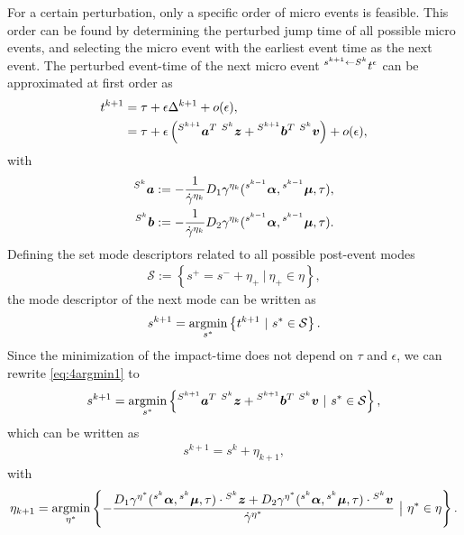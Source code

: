 \documentclass[../DC2019003Bouma.tex]{subfiles}
\begin{document}
For a certain perturbation, only a specific order of micro events is feasible. This order can be found by determining the perturbed jump time of all possible micro events, and selecting the micro event with the earliest event time as the next event. The perturbed event-time of the next micro event $\hspace{0cm}^{s^{k+1} \leftarrow S^{k}}t^\epsilon$ can be approximated at first order as
\begin{align}
t^{k+1} &= \tau + \epsilon\Delta^{k+1} + o(\epsilon),\\
&= \tau + \epsilon\left(\hspace{0cm}^{S^{k+1}}{\boldsymbol{a}}^T\ \hspace{0cm}^{S^k}{\boldsymbol{z}} +\hspace{0cm}^{S^{k+1}}{\boldsymbol{b}}^T\ \hspace{0cm}^{S^k}{\boldsymbol{v}}\right) + o(\epsilon),
\end{align}
with
\begin{align*}
\hspace{0cm}^{S^k}{\boldsymbol{a}} &:= -\frac{1}{\dot{\gamma}^{\eta_k}}D_1\gamma^{\eta_k}(\hspace{0cm}^{s^{k-1}}\boldsymbol{\alpha},\hspace{0cm}^{s^{k-1}}\boldsymbol{\mu},\tau),\\
\hspace{0cm}^{S^k}{\boldsymbol{b}} &:= -\frac{1}{\dot{\gamma}^{\eta_k}}D_2\gamma^{\eta_k}(\hspace{0cm}^{s^{k-1}}\boldsymbol{\alpha},\hspace{0cm}^{s^{k-1}}\boldsymbol{\mu},\tau).
\end{align*}
Defining the set mode descriptors related to all possible post-event modes 
\begin{align}
\mathcal{S} := \left\{ s^+ = s^- + \eta_+ \ |\ \eta_+\in \eta \right\},
\end{align}
the mode descriptor of the next mode can be written as
%
\begin{align}
s^{k+1} = \underset{s^{\ast}}{\argmin}\left\{t^{k+1}\ |\ s^{\ast}\in\mathcal{S}\right\}.\label{eq:4argmin1}
\end{align}
Since the minimization of the impact-time does not depend on $\tau$ and $\epsilon$, we can rewrite \eqref{eq:4argmin1} to
\begin{align}
s^{k+1} = \underset{s^{\ast}}{\argmin}\left\{\ls^{S^{k+1}}\ab^T\ \ls^{S^k}\zb +\ls^{S^{k+1}}\bb^T\ \ls^{S^k}\vb\ |\ s^{\ast}\in\mathcal{S}\right\},
\end{align}
which can be written as
\begin{align}
s^{k+1} = s^k + \eta_{k+1},
\end{align}
with 
\begin{align}
\eta_{k+1} = \underset{\eta^\ast}{\argmin}\left\{-\frac{D_1\gamma^{\eta^\ast}(\ls^{s^k}\alphab,\ls^{s^k}\mub,\tau)\cdot\ls^{S^k}\zb + D_2\gamma^{\eta^\ast}(\ls^{s^k}\alphab,\ls^{s^k}\mub,\tau)\cdot\ls^{S^k}\vb}{\dot{\gamma}^{\eta^\ast}}\ \big|\ \eta^{\ast}\in\eta\right\}.\label{eq:4argmin2}
\end{align}
\end{document}
